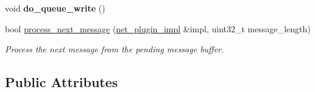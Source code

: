 \begin{DoxyCompactItemize}
$$\item 
\mbox{\label{classaacio_1_1connection_af87d29dfa08d743a7b4723fa9654c5cb}} 
void {\bfseries do\+\_\+queue\+\_\+write} ()
\item 
bool \mbox{\hyperlink{classaacio_1_1connection_afe0bbf6f9135632ae62870c6c3582f86}{process\+\_\+next\+\_\+message}} (\mbox{\hyperlink{classaacio_1_1net__plugin__impl}{net\+\_\+plugin\+\_\+impl}} \&impl, uint32\+\_\+t message\+\_\+length)
\begin{DoxyCompactList}\small\item\em Process the next message from the pending message buffer. \end{DoxyCompactList}\end{DoxyCompactItemize}
\subsection*{Public Attributes}
